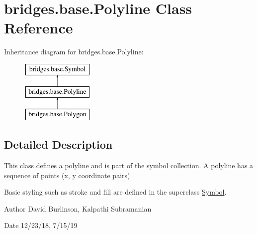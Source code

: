 \hypertarget{classbridges_1_1base_1_1_polyline}{}\section{bridges.\+base.\+Polyline Class Reference}
\label{classbridges_1_1base_1_1_polyline}
Inheritance diagram for bridges.\+base.\+Polyline\+:\begin{figure}[H]
\begin{center}
\leavevmode
\includegraphics[height=3.000000cm]{classbridges_1_1base_1_1_polyline}
\end{center}
\end{figure}


\subsection{Detailed Description}
This class defines a polyline and is part of the symbol collection. A polyline has a sequence of points (x, y coordinate pairs) 

Basic styling such as stroke and fill are defined in the superclass \hyperlink{classbridges_1_1base_1_1_symbol}{Symbol}.

\begin{DoxyAuthor}{Author}
David Burlinson, Kalpathi Subramanian 
\end{DoxyAuthor}
\begin{DoxyDate}{Date}
12/23/18, 7/15/19 
\end{DoxyDate}
